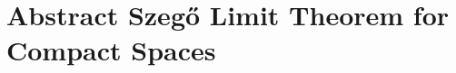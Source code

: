 \documentclass{amsart}
\theoremstyle{definition}
\theoremstyle{remark}
\numberwithin{equation}{section}
\newcommand{\norm}[1]{\left\lVert #1 \right\rVert} %
\begin{document}

\section{Abstract Szeg\H{o} Limit Theorem for Compact Spaces}
\end{document}
